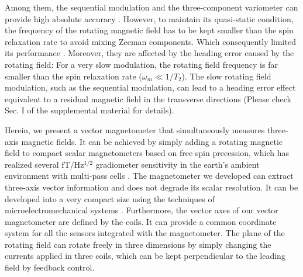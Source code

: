 \documentclass[prx,twocolumn,10pt,nofootinbib]{revtex4-1}
\begin{document}
Among them, the sequential modulation and the three-component variometer can provide high absolute accuracy \cite{aleksandrov2009modern}. However, to maintain its quasi-static condition, the frequency of the rotating magnetic field has to be kept smaller than the spin relaxation rate to avoid mixing Zeeman components. Which consequently limited its performance \cite{alexandrov2004three, vershovskii2006fast}. Moreover, they are affected by the heading error caused by the rotating field: For a very slow modulation, the rotating field frequency is far smaller than the spin relaxation rate ($\omega_m \ll 1/T_2$). The slow rotating field modulation, such as the sequential modulation, can lead to a heading error effect equivalent to a residual magnetic field in the transverse directions (Please check Sec. I of the supplemental material for details).

Herein, we present a vector magnetometer that simultaneously measures three-axis magnetic fields. It can be achieved by simply adding a rotating magnetic field to compact scalar magnetometers based on free spin precession,  which has realized several $\mathrm{fT/Hz^{1/2}}$ gradiometer sensitivity in the earth's ambient environment with multi-pass cells \cite{limes2020portable, lucivero2021femtotesla}. The magnetometer we developed can extract three-axis vector information and does not degrade its scalar resolution. It can be developed into a very compact size using the techniques of microelectromechanical systems \cite{schwindt2004chip, liew2004microfabricated, shah2007subpicotesla, gerginov2020scalar}. Furthermore, the vector axes of our vector magnetometer are defined by the coils. It can provide a common coordinate system for all the sensors integrated with the magnetometer. The plane of the rotating field can rotate freely in three dimensions by simply changing the currents applied in three coils, which can be kept perpendicular to the leading field by feedback control.
\end{document}
